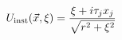 \begin{equation}
U_{\rm inst}(\vec{x},\xi)=
\frac{\xi + i \tau_{j}x_{j}}{\sqrt{r^2+\xi^2}}
\label{definst2}
\end{equation}

